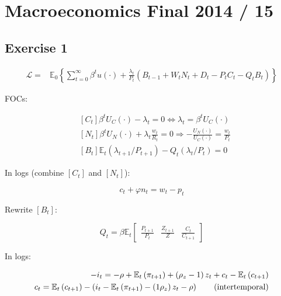 \section{Macroeconomics Final 2014 / 15}

{
\subsection*{Exercise 1}

\begin{enumerate}[label=(\alph*)]
{\item 
$$
\begin{aligned}
\mathcal{L}= & \mathbb{E}_{0}\left\{\sum_{t=0}^{\infty} \beta^{t} u(\cdot)+\frac{\lambda_{t}}{P_{t}}\left(B_{t-1}+W_{t} N_{t}+D_{t}-P_{t} C_{t}-Q_{t} B_{t}\right)\right\}
\end{aligned}
$$

FOCs:

$$
\begin{aligned}
& {\left[C_{t}\right] \beta^{t} U_{C}(\cdot)-\lambda_{t}=0 \Leftrightarrow \lambda_{t}=\beta^{t} U_{C}(\cdot) } \\
& {\left[N_{t}\right] \beta^{t} U_{N}(\cdot)+\lambda_{t} \frac{w_{t}}{R_{t}}=0 \Rightarrow-\frac{U_{N}(\cdot)}{U_{C}(\cdot)}=\frac{w_{t}}{P_{t}} } \\
& {\left[B_{t}\right] \mathbb{E}_{t}\left(\lambda_{t+1} / P_{t+1}\right)-Q_{t}\left(\lambda_{t} / P_{t}\right)=0 }
\end{aligned}
$$

In logs (combine $\left[C_{t}\right]$ and $\left[N_{t}\right]$):

\begin{equation}
    c_{t}+\varphi n_{t}=w_{t}- p_{t} \tag{intratemporal}
\end{equation}

Rewrite $\left[B_{t}\right]$:

$$
Q_{t}=\beta \mathbb{E}_{t}\left[\begin{array}{lll}
\frac{P_{t+1}}{P_{t}} & \frac{Z_{t+1}}{Z} & \frac{C_{t}}{C_{t+1}}
\end{array}\right]
$$

In logs: 

\begin{align}
    -i_{t}=-\rho+\mathbb{E}_{t}\left(\pi_{t+1}\right)+\left(\rho_{z}-1\right) z_{t}+c_{t}-\mathbb{E}_{t}\left(c_{t+1}\right) \notag \\
    c_{t}=\mathbb{E}_{t}\left(c_{t+1}\right)-\left(i_{t}-\mathbb{E}_{t}\left(\pi_{t+1}\right)-\left(1\rho_{z}\right) z_{t}-\rho\right) \tag{intertemporal}
\end{align}

}
\end{enumerate}}
